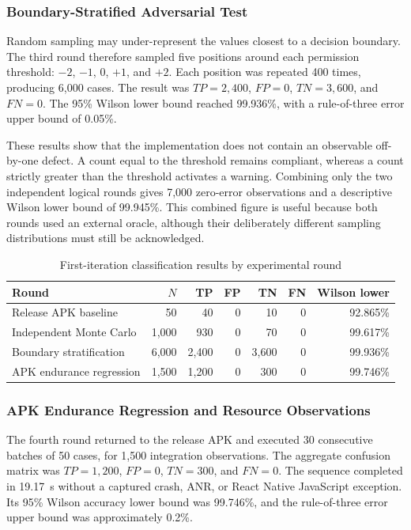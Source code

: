 \subsubsection{Boundary-Stratified Adversarial Test}

Random sampling may under-represent the values closest to a decision boundary. The third round therefore sampled five positions around each permission threshold: \(-2\), \(-1\), \(0\), \(+1\), and \(+2\). Each position was repeated 400 times, producing 6,000 cases. The result was \(TP=2,400\), \(FP=0\), \(TN=3,600\), and \(FN=0\). The 95\% Wilson lower bound reached 99.936\%, with a rule-of-three error upper bound of 0.05\%.

These results show that the implementation does not contain an observable off-by-one defect. A count equal to the threshold remains compliant, whereas a count strictly greater than the threshold activates a warning. Combining only the two independent logical rounds gives 7,000 zero-error observations and a descriptive Wilson lower bound of 99.945\%. This combined figure is useful because both rounds used an external oracle, although their deliberately different sampling distributions must still be acknowledged.

\begin{table}[H]
\centering
\caption{First-iteration classification results by experimental round}
\label{tab:ch5-first-iteration}
\small
\begin{tabular}{lrrrrrr}
\toprule
\textbf{Round} & \textbf{\(N\)} & \textbf{TP} & \textbf{FP} & \textbf{TN} & \textbf{FN} & \textbf{Wilson lower} \\
\midrule
Release APK baseline & 50 & 40 & 0 & 10 & 0 & 92.865\% \\
Independent Monte Carlo & 1,000 & 930 & 0 & 70 & 0 & 99.617\% \\
Boundary stratification & 6,000 & 2,400 & 0 & 3,600 & 0 & 99.936\% \\
APK endurance regression & 1,500 & 1,200 & 0 & 300 & 0 & 99.746\% \\
\bottomrule
\end{tabular}
\end{table}

\subsubsection{APK Endurance Regression and Resource Observations}

The fourth round returned to the release APK and executed 30 consecutive batches of 50 cases, for 1,500 integration observations. The aggregate confusion matrix was \(TP=1,200\), \(FP=0\), \(TN=300\), and \(FN=0\). The sequence completed in 19.17~s without a captured crash, ANR, or React Native JavaScript exception. Its 95\% Wilson accuracy lower bound was 99.746\%, and the rule-of-three error upper bound was approximately 0.2\%.

